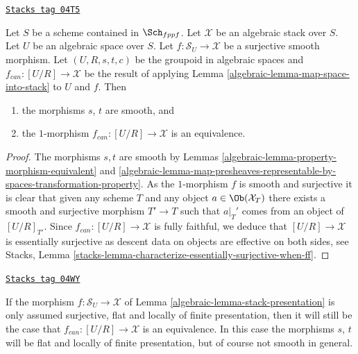 \begin{lemma}
\label{algebraic-lemma-stack-presentation}
\href{https://stacks.math.columbia.edu/tag/04T5}{\texttt{Stacks tag 04T5}}

Let $S$ be a scheme contained in $\Sch_{fppf}$.
Let $\mathcal{X}$ be an algebraic stack over $S$.
Let $U$ be an algebraic space over $S$.
Let $f : \mathcal{S}_U \to \mathcal{X}$ be a surjective smooth morphism.
Let $(U, R, s, t, c)$ be the groupoid in algebraic spaces
and $f_{can} : [U/R] \to \mathcal{X}$ be the result of applying
Lemma \ref{algebraic-lemma-map-space-into-stack}
to $U$ and $f$. Then
\begin{enumerate}
\item the morphisms $s$, $t$ are smooth, and
\item the $1$-morphism $f_{can} : [U/R] \to \mathcal{X}$
is an equivalence.
\end{enumerate}
\end{lemma}

\begin{proof}

The morphisms $s, t$ are smooth by
Lemmas \ref{algebraic-lemma-property-morphism-equivalent} and
\ref{algebraic-lemma-map-presheaves-representable-by-spaces-transformation-property}.
As the $1$-morphism $f$ is smooth and
surjective it is clear that given any scheme $T$ and any object
$a \in \Ob(\mathcal{X}_T)$ there exists a smooth and surjective
morphism $T' \to T$ such that $a|_T'$ comes from an object of
$[U/R]_{T'}$. Since $f_{can} : [U/R] \to \mathcal{X}$
is fully faithful, we deduce that
$[U/R] \to \mathcal{X}$ is essentially surjective as
descent data on objects are effective on both sides, see
Stacks, Lemma \ref{stacks-lemma-characterize-essentially-surjective-when-ff}.
\end{proof}

\begin{remark}
\label{algebraic-remark-flat-fp-presentation}
\href{https://stacks.math.columbia.edu/tag/04WY}{\texttt{Stacks tag 04WY}}

If the morphism $f : \mathcal{S}_U \to \mathcal{X}$ of
Lemma \ref{algebraic-lemma-stack-presentation}
is only assumed surjective, flat and locally of finite presentation, then
it will still be the case that $f_{can} : [U/R] \to \mathcal{X}$ is an
equivalence. In this case the morphisms $s$, $t$ will be flat and
locally of finite presentation, but of course not smooth in general.
\end{remark}

